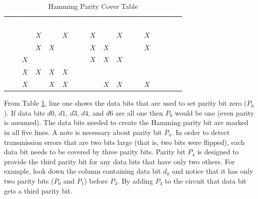 \begin{table}[H]
  \sffamily
  \newcommand{\head}[1]{\textcolor{white}{\textbf{#1}}}		
  \begin{center}
    \begin{tabular}{ccccccccccccc} 
      \rowcolor{black!75}
      \head{$ P_4 $} & \head{$ d_7 $} & \head{$ d_6 $} &
      \head{$ d_5 $} & \head{$ d_4 $} & \head{$ P_3 $} &
      \head{$ d_3 $} & \head{$ d_2 $} & \head{$ d_1 $} &
      \head{$ P_2 $} & \head{$ d_0 $} & \head{$ P_1 $} &
      \head{$ P_0 $} \\
      \color{gray}{$ 0 $} & \color{gray}{$ 0 $} & $ X $ &
      \color{gray}{$ 0 $} & $ X $ & \color{gray}{$ 0 $} &
      $ X $ & \color{gray}{$ 0 $} & $ X $ &
      \color{gray}{$ 0 $} & $ X $ & \color{gray}{$ 0 $} &
      \color{red}{$ P $} \\
      \color{gray}{$ 0 $} & \color{gray}{$ 0 $} & $ X $ &
      $ X $ & \color{gray}{$ 0 $} & \color{gray}{$ 0 $} &
      $ X $ & $ X $ & \color{gray}{$ 0 $} &
      \color{gray}{$ 0 $} & $ X $ & \color{red}{$ P $} &
      \color{gray}{$ 0 $} \\
      \color{gray}{$ 0 $} & $ X $ & \color{gray}{$ 0 $} &
      \color{gray}{$ 0 $} & \color{gray}{$ 0 $} & \color{gray}{$ 0 $} &
      $ X $ & $ X $ & $ X $ &
      \color{red}{$ P $} & \color{gray}{$ 0 $} & \color{gray}{$ 0 $} &
      \color{gray}{$ 0 $} \\
      \color{gray}{$ 0 $} & $ X $ & $ X $ &
      $ X $ & $ X $ & \color{red}{$ P $} &
      \color{gray}{$ 0 $} & \color{gray}{$ 0 $} & \color{gray}{$ 0 $} &
      \color{gray}{$ 0 $} & \color{gray}{$ 0 $} & \color{gray}{$ 0 $} &
      \color{gray}{$ 0 $} \\
      \color{red}{$ P $} & $ X $ & \color{gray}{$ 0 $} &
      $ X $ & $ X $ & \color{gray}{$ 0 $} &
      \color{gray}{$ 0 $} & $ X $ & $ X $ &
      \color{gray}{$ 0 $} & $ X $ & \color{gray}{$ 0 $} &
      \color{gray}{$ 0 $} 
    \end{tabular}
  \end{center}
  \caption{Hamming Parity Cover Table}
  \label{cl:tab:hamming_parity_cover_table}
\end{table}

From Table \ref{cl:tab:hamming_parity_cover_table}, line one shows the data bits that are used to set parity bit zero ($ P_{0} $). If data bits $ d0 $, $ d1 $, $ d3 $, $ d4 $, and $ d6 $ are all one then $ P_{0} $ would be one (even parity is assumed). The data bits needed to create the Hamming parity bit are marked in all five lines. A note is necessary about parity bit $ P_4 $. In order to detect transmission errors that are two bits large (that is, two bits were flipped), each data bit needs to be covered by three parity bits. Parity bit $ P_4 $ is designed to provide the third parity bit for any data bits that have only two others. For example, look down the column containing data bit $ d_0 $ and notice that it has only two parity bits ($ P_0 $ and $ P_1 $) before $ P_4 $. By adding $ P_4 $ to the circuit that data bit gets a third parity bit.

